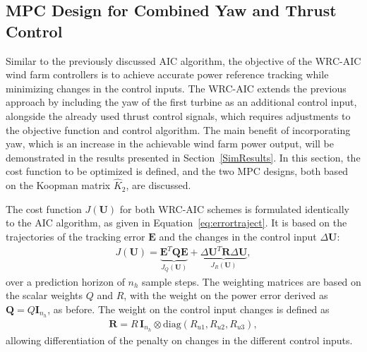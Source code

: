 \subsection{MPC Design for Combined Yaw and Thrust Control} \label{qLMPCDesign} 
Similar to the previously discussed AIC algorithm, the objective of the WRC-AIC wind farm controllers is to achieve accurate power reference tracking while minimizing changes in the control inputs. The WRC-AIC extends the previous approach by including the yaw of the first turbine as an additional control input, alongside the already used thrust control signals, which requires adjustments to the objective function and control algorithm. The main benefit of incorporating yaw, which is an increase in the achievable wind farm power output, will be demonstrated in the results presented in Section~\ref{SimResults}. In this section, the cost function to be optimized is defined, and the two MPC designs, both based on the Koopman matrix $\hat{K}_2$, are discussed.

The cost function $J(\bm{U})$ for both WRC-AIC schemes is formulated identically to the AIC algorithm, as given in Equation~\eqref{eq:errortraject}. It is based on the trajectories of the tracking error $\bm{E}$ and the changes in the control input $\Delta \bm{U}$:
\begin{align*} 
    J(\bm{U}) = \underbrace{\bm{E}^T \bm{Q} \bm{E}}_{J_Q (\bm{U})} + \underbrace{\Delta \bm{U}^T \bm{R} \Delta \bm{U}}_{J_R (\bm{U})},
\end{align*}
over a prediction horizon of $n_h$ sample steps. The weighting matrices are based on the scalar weights $Q$ and $R$, with the weight on the power error derived as $\bm{Q} = Q \bm{I}_{n_h}$, as before. The weight on the control input changes is defined as
\begin{align*}
    \bm{R} = R \, \bm{I}_{n_h} \otimes \mathrm{diag}(R_{u1}, R_{u2}, R_{u3}),
\end{align*}
allowing differentiation of the penalty on changes in the different control inputs.

